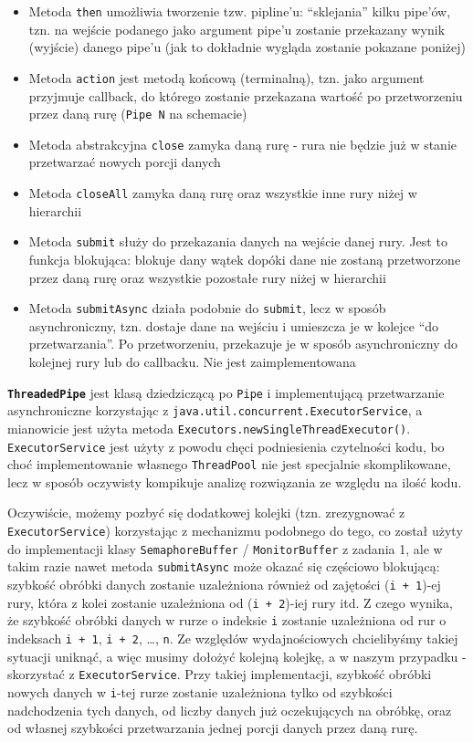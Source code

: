 \documentclass[11pt]{article}
\providecommand{\tightlist}{%
      \setlength{\itemsep}{0pt}\setlength{\parskip}{0pt}}
\begin{document}
\begin{itemize}
\tightlist
\item
  Metoda \texttt{then} umożliwia tworzenie tzw. pipline'u: ``sklejania''
  kilku pipe'ów, tzn. na wejście podanego jako argument pipe'u zostanie
  przekazany wynik (wyjście) danego pipe'u (jak to dokładnie wygląda
  zostanie pokazane poniżej)
\item
  Metoda \texttt{action} jest metodą końcową (terminalną), tzn. jako
  argument przyjmuje callback, do którego zostanie przekazana wartość po
  przetworzeniu przez daną rurę (\texttt{Pipe\ N} na schemacie)
\item
  Metoda abstrakcyjna \texttt{close} zamyka daną rurę - rura nie będzie
  już w stanie przetwarzać nowych porcji danych
\item
  Metoda \texttt{closeAll} zamyka daną rurę oraz wszystkie inne rury
  niżej w hierarchii
\item
  Metoda \texttt{submit} służy do przekazania danych na wejście danej
  rury. Jest to funkcja blokująca: blokuje dany wątek dopóki dane nie
  zostaną przetworzone przez daną rurę oraz wszystkie pozostałe rury
  niżej w hierarchii
\item
  Metoda \texttt{submitAsync} działa podobnie do \texttt{submit}, lecz w
  sposób asynchroniczny, tzn. dostaje dane na wejściu i umieszcza je w
  kolejce ``do przetwarzania''. Po przetworzeniu, przekazuje je w sposób
  asynchroniczny do kolejnej rury lub do callbacku. Nie jest
  zaimplementowana
\end{itemize}

    \textbf{\texttt{ThreadedPipe}} jest klasą dziedziczącą po \texttt{Pipe}
i implementującą przetwarzanie asynchroniczne korzystając z
\texttt{java.util.concurrent.ExecutorService}, a mianowicie jest użyta
metoda \texttt{Executors.newSingleThreadExecutor()}.
\texttt{ExecutorService} jest użyty z powodu chęci podniesienia
czytelności kodu, bo choć implementowanie własnego \texttt{ThreadPool}
nie jest specjalnie skomplikowane, lecz w sposób oczywisty kompikuje
analizę rozwiązania ze względu na ilość kodu.

Oczywiście, możemy pozbyć się dodatkowej kolejki (tzn. zrezygnować z
\texttt{ExecutorService}) korzystając z mechanizmu podobnego do tego, co
został użyty do implementacji klasy \texttt{SemaphoreBuffer} /
\texttt{MonitorBuffer} z zadania 1, ale w takim razie nawet metoda
\texttt{submitAsync} może okazać się częściowo blokującą: szybkość
obróbki danych zostanie uzależniona również od zajętości
(\texttt{i\ +\ 1})-ej rury, która z kolei zostanie uzależniona od
(\texttt{i\ +\ 2})-iej rury itd. Z czego wynika, że szybkość obróbki
danych w rurze o indeksie \texttt{i} zostanie uzależniona od rur o
indeksach \texttt{i\ +\ 1}, \texttt{i\ +\ 2}, \ldots, \texttt{n}. Ze
względów wydajnościowych chcielibyśmy takiej sytuacji uniknąć, a więc
musimy dołożyć kolejną kolejkę, a w naszym przypadku - skorzystać z
\texttt{ExecutorService}. Przy takiej implementacji, szybkość obróbki
nowych danych w \texttt{i}-tej rurze zostanie uzależniona tylko od
szybkości nadchodzenia tych danych, od liczby danych już oczekujących na
obróbkę, oraz od własnej szybkości przetwarzania jednej porcji danych
przez daną rurę.
\end{document}
